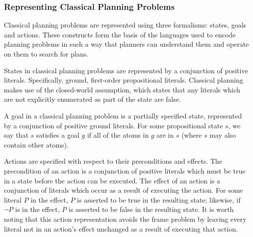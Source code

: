 \subsubsection{Representing Classical Planning Problems}

Classical planning problems are represented using three formalisms: states, goals and actions. These constructs form the basis of the languages used to encode planning problems in such a way that planners can understand them and operate on them to search for plans. 

States in classical planning problems are represented by a conjunction of positive literals. Specifically, ground, first-order propositional literals. Classical planning makes use of the closed-world assumption, which states that any literals which are not explicitly enumerated as part of the state are false.

A goal in a classical planning problem is a partially specified state, represented by a conjunction of positive ground literals. For some propositional state $s$, we say that $s$ satisfies a goal $g$ if all of the atoms in $g$ are in $s$ (where $s$ may also contain other atoms).

Actions are specified with respect to their preconditions and effects. The precondition of an action is a conjunction of positive literals which must be true in a state before the action can be executed. The effect of an action is a conjunction of literals which occur as a result of executing the action. For some literal $P$ in the effect, $P$ is asserted to be true in the resulting state; likewise, if $\lnot P$ is in the effect, $P$ is asserted to be false in the resulting state. It is worth noting that this action representation avoids the frame problem by leaving every literal not in an action's effect unchanged as a result of executing that action. 

